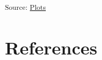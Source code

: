 \documentclass[
  letterpaper,
  DIV=11,
  numbers=noendperiod]{scrartcl}
\begin{document}
\textsubscript{Source:
\href{https://juliam98.github.io/phd-upgrade-proposal/notebooks/plots-preview.html\#cell-fig-gantt-chart}{Plots}}

\newpage{}

\section{References}\label{references}

\printbibliography[heading=none]
\end{document}
